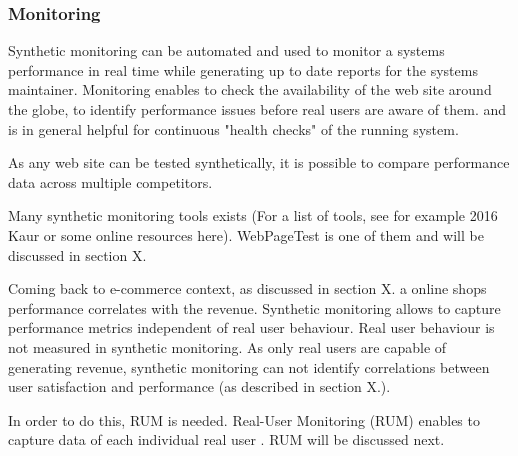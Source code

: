 \subsubsection{Monitoring}


Synthetic monitoring can be automated and used to monitor a systems performance in real time while generating up to date reports for the systems maintainer. %
Monitoring enables to check the availability of the web site around the globe, %
to identify performance issues before real users are aware of them. %
and is in general helpful for continuous "health checks" of the running system. %

As any web site can be tested synthetically, it is possible to compare performance data across multiple competitors. %



Many synthetic monitoring tools exists (For a list of tools, see for example 2016 Kaur or some online resources here).
WebPageTest is one of them and will be discussed in section X.




Coming back to e-commerce context, as discussed in section X.  a online shops performance correlates with the revenue.
Synthetic monitoring allows to capture performance metrics independent of real user behaviour.
Real user behaviour is not measured in synthetic monitoring.
As only real users are capable of generating revenue, synthetic monitoring can not identify correlations between user satisfaction and performance (as described in section X.).%

In order to do this, RUM is needed.
Real-User Monitoring (RUM) enables to capture data of each individual real user .
RUM will be discussed next.








